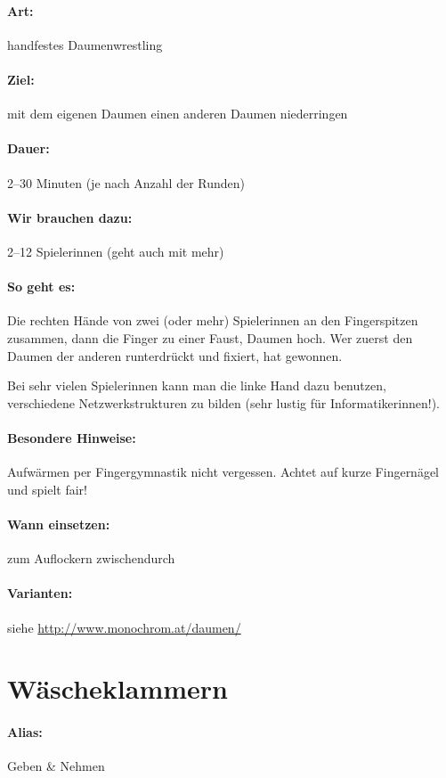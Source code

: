 \paragraph{Art:} handfestes Daumenwrestling
\paragraph{Ziel:} mit dem eigenen Daumen einen anderen Daumen niederringen
\paragraph{Dauer:} 2--30 Minuten (je nach Anzahl der Runden)
\paragraph{Wir brauchen dazu:} 2--12 Spielerinnen (geht auch mit mehr)
\paragraph{So geht es:}
Die rechten Hände von zwei (oder mehr) Spielerinnen an den Fingerspitzen zusammen, dann die Finger zu einer Faust, Daumen hoch. Wer zuerst den Daumen der anderen runterdrückt und fixiert, hat gewonnen.

Bei sehr vielen Spielerinnen kann man die linke Hand dazu benutzen, verschiedene Netzwerkstrukturen zu bilden (sehr lustig für Informatikerinnen!).

\paragraph{Besondere Hinweise:} Aufwärmen per Fingergymnastik nicht vergessen. Achtet auf kurze Fingernägel und spielt fair!
\paragraph{Wann einsetzen:} zum Auflockern zwischendurch
\paragraph{Varianten:} siehe \url{http://www.monochrom.at/daumen/}


\section{Wäscheklammern}
\paragraph{Alias:} Geben \& Nehmen
